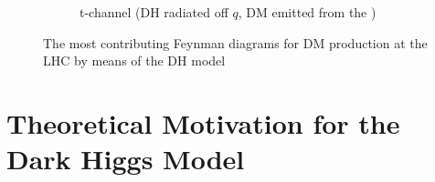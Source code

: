\begin{figure}[hp]
\begin{subfigure}[t]{.42\textwidth}
%
%
%
%
	\caption{t-channel (DH radiated off \(q\), DM emitted from the \Zprime)}
	\label{fig:dh_tchannel}
	\end{subfigure}
	\caption{The most contributing Feynman diagrams for DM production at the LHC by means of the DH model}
	\label{fig:Feynman_DH}
\end{figure}


\section{Theoretical Motivation for the Dark Higgs Model}

